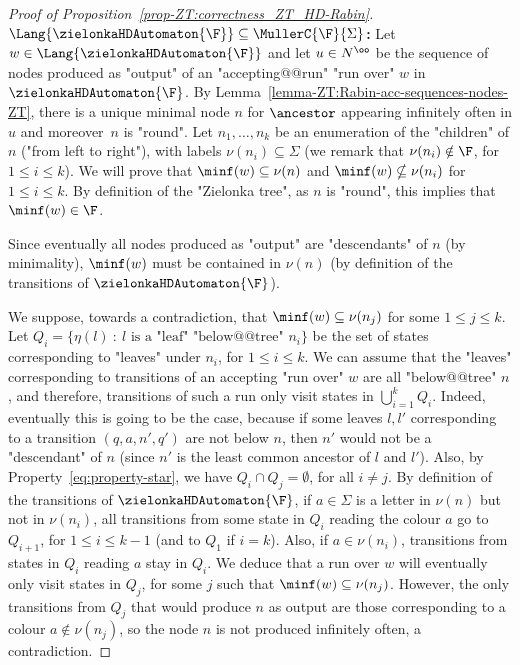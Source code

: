 \documentclass[10pt,a4paper]{amsart}
\renewcommand{\SS}{\Sigma}
\begin{document}
\begin{proof}[Proof of Proposition~\ref{prop-ZT:correctness_ZT_HD-Rabin}]
	\textbf{$\Lang{\zielonkaHDAutomaton{\F}} \subseteq \MullerC{\F}{\SS}$:} Let $w\in \Lang{\zielonkaHDAutomaton{\F}}$ and let $u\in N^\oo$ be the sequence of nodes produced as "output" of an "accepting@@run" "run over" $w$ in $\zielonkaHDAutomaton{\F}$. By Lemma~\ref{lemma-ZT:Rabin-acc-sequences-nodes-ZT}, there is a unique  minimal node $n$ for $\ancestor$ appearing infinitely often in $u$ and moreover~$n$ is "round".
	Let $n_1, \dots, n_k$ be an enumeration of the "children" of $n$ ("from left to right"), with labels $\nu(n_i)\subseteq \SS$ (we remark that $\nu(n_i)\notin \F$, for $1\leq i \leq k$). We will prove that $\minf(w)\subseteq \nu(n)$ and $\minf(w)\nsubseteq \nu(n_i)$ for $1\leq i \leq k$. By definition of the "Zielonka tree", as $n$ is "round", this implies that $\minf(w)\in \F$.
	
	
	Since eventually all nodes produced as "output" are "descendants" of $n$ (by minimality), $\minf(w)$ must be contained in $\nu(n)$ (by definition of the transitions of $\zielonkaHDAutomaton{\F}$).
	
	We suppose, towards a contradiction, that $\minf(w)\subseteq \nu(n_j)$ for some $1\leq j \leq k$.  
	Let $Q_i=\{\eta(l)\: : \: l \text{ is a "leaf" "below@@tree" } n_i\}$ be the set of states corresponding to "leaves" under $n_i$, for $1\leq i \leq k$. We can assume that the "leaves" corresponding to transitions of an accepting "run over" $w$ are all "below@@tree" $n$, and therefore, transitions of such a run only visit states in $\bigcup_{i=1}^kQ_i$. Indeed, eventually this is going to be the case, because if some leaves $l, l'$ corresponding to a transition $(q,a,n',q')$ are not below $n$, then $n'$ would not be a "descendant" of $n$ (since $n'$ is the least common ancestor of $l$ and $l'$).
	Also, by Property~\eqref{eq:property-star}, we have $Q_i\cap Q_j = \emptyset$, for all $i\neq j$.
	By definition of the transitions of $\zielonkaHDAutomaton{\F}$, if $a\in \SS$ is a letter in $\nu(n)$ but not in $\nu(n_i)$, all transitions from some state in $Q_i$ reading the colour $a$ go to $Q_{i+1}$, for $1\leq i \leq k-1$ (and to $Q_1$ if $i=k$).
	Also, if $a\in \nu(n_i)$, transitions from states in $Q_i$ reading $a$ stay in $Q_i$.	
	We deduce that a run over $w$ will eventually only visit states in $Q_j$, for some $j$ such that $\minf(w)\subseteq \nu(n_j)$. However, the only transitions
	from $Q_j$ that would produce $n$ as output are those corresponding to a colour $a\notin \nu(n_j)$, so the node $n$ is not produced infinitely often, a contradiction.	


\end{proof}
\end{document}
